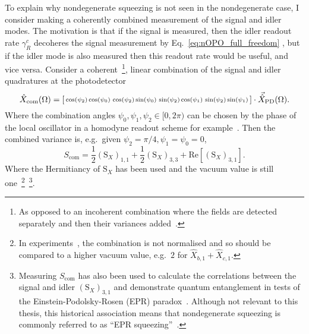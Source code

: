 To explain why nondegenerate squeezing is not seen in the nondegenerate case, I consider making a coherently combined measurement of the signal and idler modes. The motivation is that if the signal is measured, then the idler readout rate $\gamma^c_R$ decoheres the signal measurement by Eq.~\ref{eq:nOPO_full_freedom} , but if the idler mode is also measured then this readout rate would be useful, and vice versa. Consider a coherent~\footnote{As opposed to an incoherent combination where the fields are detected separately and then their variances added~\cite{}.}, linear combination of the signal and idler quadratures at the photodetector~\cite{schoriNarrowbandFrequencyTunable2002}  
\begin{equation}\label{eq:Xcom_three_angles}
\hat X_\text{com}(\Omega)=\begin{bsmallmatrix}\cos(\psi_2)\cos(\psi_0) & \cos(\psi_2)\sin(\psi_0) & \sin(\psi_2)\cos(\psi_1) & \sin(\psi_2)\sin(\psi_1)\end{bsmallmatrix}\cdot\vec{\hat X}_\text{PD}(\Omega).
\end{equation} 
Where the combination angles $\psi_0,\psi_1,\psi_2\in[0,2\pi)$ can be chosen by the phase of the local oscillator in a homodyne readout scheme for example~\cite{}.
Then the combined variance is, e.g.\ given $\psi_2=\pi/4,\psi_1=\psi_0=0$,
\begin{equation}\label{eq:Scom_nOPO_eg}
S_\text{com}=\frac{1}{2}(\text{S}_X)_{1,1}+\frac{1}{2}(\text{S}_X)_{3,3}+\text{Re}[(\text{S}_X)_{3,1}].
\end{equation} 
Where the Hermitiancy of $\text{S}_X$ has been used and the vacuum value is still one~\footnote{In experiments~\cite{schoriNarrowbandFrequencyTunable2002}, the combination is not normalised and so should be compared to a higher vacuum value, e.g.\ $2$ for $\hat X_{b,1} + \hat X_{c,1}$.}~\footnote{Measuring $S_\text{com}$ has also been used to calculate the correlations between the signal and idler $(\text{S}_X)_{3,1}$ and demonstrate quantum entanglement in tests of the Einstein-Podolsky-Rosen (EPR) paradox~\cite{PhysRev.47.777,reidDemonstrationEinsteinPodolskyRosenParadox1989,schoriNarrowbandFrequencyTunable2002}. Although not relevant to this thesis, this historical association means that nondegenerate squeezing is commonly referred to as ``EPR squeezing''~\cite{}.}. 
